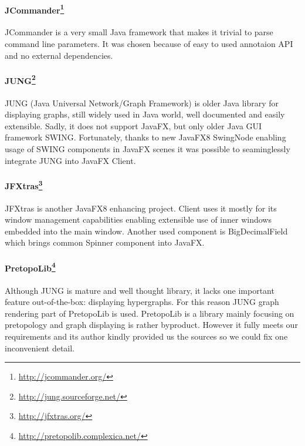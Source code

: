 \paragraph{JCommander\footnote{\url{http://jcommander.org/}}}
JCommander is a very small Java framework that makes it trivial to parse command
line parameters. It was chosen because of easy to used annotaion API and no
external dependencies.

\paragraph{JUNG\footnote{\url{http://jung.sourceforge.net/}}}
JUNG (Java Universal Network/Graph Framework) is older Java library for
displaying graphs, still widely used in Java world, well documented and easily
extensible. Sadly, it does not support JavaFX, but only older Java GUI framework
SWING. Fortunately, thanks to new JavaFX8 SwingNode enabling usage of SWING
components in JavaFX scenes it was possible to seaminglessly integrate JUNG into
JavaFX \textan{} Client.

\paragraph{JFXtras\footnote{\url{http://jfxtras.org/}}}
JFXtras is another JavaFX8 enhancing project. \textan{} Client uses it mostly
for its window management capabilities enabling extensible use of inner windows
embedded into the main window. Another used component is BigDecimalField which
brings common Spinner component into JavaFX.

\paragraph{PretopoLib\footnote{\url{http://pretopolib.complexica.net/}}}
Although JUNG is mature and well thought library, it lacks one important feature
out-of-the-box: displaying hypergraphs. For this reason JUNG graph rendering
part of PretopoLib is used. PretopoLib is a library mainly focusing on
pretopology and graph displaying is rather byproduct. However it fully meets our
requirements and its author kindly provided us the sources so we could fix one
inconvenient detail.